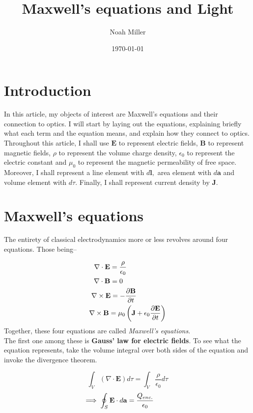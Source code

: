 \documentclass[12pt]{article}
\title{Maxwell's equations and Light}
\author{Noah Miller}
\date{\today}
\begin{document}
\maketitle
\section{Introduction}
In this article, my objects of interest are Maxwell's equations and their connection to optics.
I will start by laying out the equations, explaining briefly what each term and the equation means, and 
explain how they connect to optics. \\
Throughout this article, I shall use $\mathbf{E}$ to represent electric fields, $\mathbf{B}$ to represent 
magnetic fields, $\rho$ to represent the volume charge density, $\epsilon_0$ to represent the electric constant 
and $\mu_0$ to represent the magnetic permeability of free space. Moreover, I shall represent a line element with $d\mathbf{l},$ area element with $d\mathbf{a}$ and 
volume element with $d\tau$. Finally, I shall represent current density by $\mathbf{J}$.

\section{Maxwell's equations}
The entirety of classical electrodynamics more or less revolves around four equations. Those being--

\begin{align}
    \nabla \cdot \mathbf{E} = \frac{\rho}{\epsilon_0} \hspace{2cm}\\
    \nabla \cdot \mathbf{B} = 0 \hspace{2.2cm}\\
    \nabla \times \mathbf{E} = -\frac{\partial \mathbf{B}}{\partial t}\hspace{1.5cm} \\
    \nabla \times \mathbf{B} = \mu_0\left(\mathbf{J}+\epsilon_0\frac{\partial \mathbf{E}}{\partial t}\right)
\end{align}
Together, these four equations are called \textit{Maxwell's equations}.\\
The first one among these is \textbf{Gauss' law for electric fields}. To see what the equation represents, 
take the volume integral over both sides of the equation and invoke the divergence theorem. 

\[\int_V (\nabla \cdot \mathbf{E})d\tau = \int_V\frac{\rho}{\epsilon_0}d\tau\]
\[\implies\oint_S \mathbf{E}\cdot d\mathbf{a} = \frac{Q_{enc.}}{\epsilon_0} \hspace{0.9cm}\]
\end{document}
